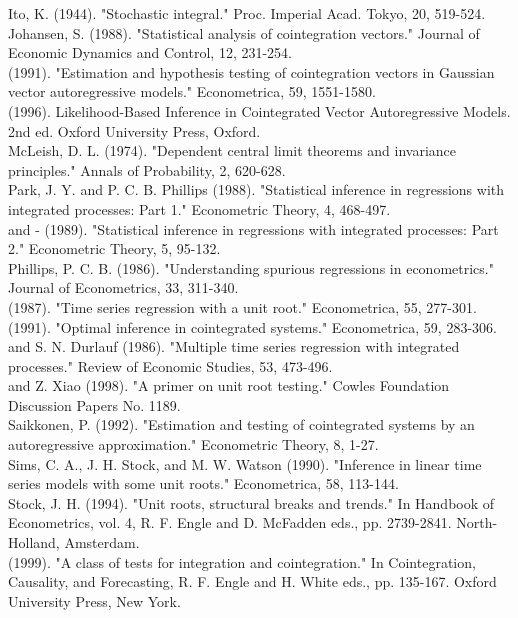 \documentclass[10pt]{article}
\begin{document}
Ito, K. (1944). "Stochastic integral." Proc. Imperial Acad. Tokyo, 20, 519-524.\\
Johansen, S. (1988). "Statistical analysis of cointegration vectors." Journal of Economic Dynamics and Control, 12, 231-254.\\
(1991). "Estimation and hypothesis testing of cointegration vectors in Gaussian vector autoregressive models." Econometrica, 59, 1551-1580.\\
(1996). Likelihood-Based Inference in Cointegrated Vector Autoregressive Models. 2nd ed. Oxford University Press, Oxford.\\
McLeish, D. L. (1974). "Dependent central limit theorems and invariance principles." Annals of Probability, 2, 620-628.\\
Park, J. Y. and P. C. B. Phillips (1988). "Statistical inference in regressions with integrated processes: Part 1." Econometric Theory, 4, 468-497.\\
and - (1989). "Statistical inference in regressions with integrated processes: Part 2." Econometric Theory, 5, 95-132.\\
Phillips, P. C. B. (1986). "Understanding spurious regressions in econometrics." Journal of Econometrics, 33, 311-340.\\
(1987). "Time series regression with a unit root." Econometrica, 55, 277-301.\\
(1991). "Optimal inference in cointegrated systems." Econometrica, 59, 283-306.\\
and S. N. Durlauf (1986). "Multiple time series regression with integrated processes." Review of Economic Studies, 53, 473-496.\\
and Z. Xiao (1998). "A primer on unit root testing." Cowles Foundation Discussion Papers No. 1189.\\
Saikkonen, P. (1992). "Estimation and testing of cointegrated systems by an autoregressive approximation." Econometric Theory, 8, 1-27.\\
Sims, C. A., J. H. Stock, and M. W. Watson (1990). "Inference in linear time series models with some unit roots." Econometrica, 58, 113-144.\\
Stock, J. H. (1994). "Unit roots, structural breaks and trends." In Handbook of Econometrics, vol. 4, R. F. Engle and D. McFadden eds., pp. 2739-2841. North-Holland, Amsterdam.\\
(1999). "A class of tests for integration and cointegration." In Cointegration, Causality, and Forecasting, R. F. Engle and H. White eds., pp. 135-167. Oxford University Press, New York.\\
\end{document}

